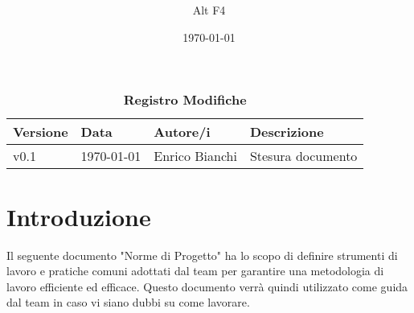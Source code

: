\documentclass[a4paper, 12pt]{article}
\title{\Huge \textbf{\titolo}}
\author{\Large{Alt} \raisebox{0.3ex}{\normalsize  +} \Large{F4}}
\date{\today}
\def\logo{../Immagini/logo.jpeg}
\def\ultima-versione{v0.1}
\begin{document}
\begin{titlepage}      
    \maketitle
    \thispagestyle{empty}  

\end{titlepage}

\tableofcontents

\newpage

\begin{table}[!h]
    \centering
    \caption*{\textbf{\Large Registro Modifiche}}
    {\renewcommand{\arraystretch}{2}
    \begin{tabularx}{\textwidth}{| X | X | X | X |}
        \hline
            \textbf{\large Versione} & 
            \textbf{\large Data} & 
            \textbf{\large Autore/i} & 
            \textbf{\large Descrizione} \\ 
        \hline \hline
            \ultima-versione & 
            \today & 
            Enrico Bianchi & 
            Stesura documento \\
        \hline 
    \end{tabularx}}
\end{table}

\newpage


    \section{Introduzione}
    Il seguente documento "Norme di Progetto" ha lo scopo di definire strumenti di lavoro e pratiche comuni adottati dal team per garantire una metodologia di lavoro efficiente ed efficace.
    Questo documento verrà quindi utilizzato come guida dal team in caso vi siano dubbi su come lavorare.
\end{document}
